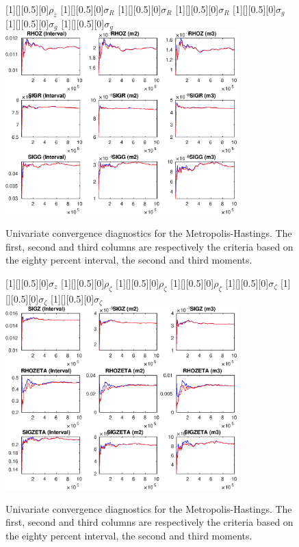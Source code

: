 \begin{figure}[H]
[1][][0.5][0]{$ {\rho_z} $}
[1][][0.5][0]{$ {\sigma_R} $}
[1][][0.5][0]{$ {\sigma_R} $}
[1][][0.5][0]{$ {\sigma_R} $}
[1][][0.5][0]{$ {\sigma_{g}} $}
[1][][0.5][0]{$ {\sigma_{g}} $}
[1][][0.5][0]{$ {\sigma_{g}} $}
\centering 
\includegraphics[width=0.80\textwidth]{AnSchoModTheBuilder/Output/AnSchoModTheBuilder_udiag4}
\caption{Univariate convergence diagnostics for the Metropolis-Hastings.
The first, second and third columns are respectively the criteria based on
the eighty percent interval, the second and third moments.}\label{Fig:UnivariateDiagnostics:4}
\end{figure}

\begin{figure}[H]
[1][][0.5][0]{$ {\sigma_z} $}
[1][][0.5][0]{$ {\rho_\zeta} $}
[1][][0.5][0]{$ {\rho_\zeta} $}
[1][][0.5][0]{$ {\rho_\zeta} $}
[1][][0.5][0]{$ {\sigma_\zeta} $}
[1][][0.5][0]{$ {\sigma_\zeta} $}
[1][][0.5][0]{$ {\sigma_\zeta} $}
\centering 
\includegraphics[width=0.80\textwidth]{AnSchoModTheBuilder/Output/AnSchoModTheBuilder_udiag5}
\caption{Univariate convergence diagnostics for the Metropolis-Hastings.
The first, second and third columns are respectively the criteria based on
the eighty percent interval, the second and third moments.}\label{Fig:UnivariateDiagnostics:5}
\end{figure}

